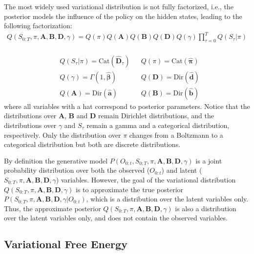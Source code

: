 \documentclass[twoside,11pt]{article}
\begin{document}
The most widely used variational distribution \citep{AI_TUTO,FRISTON2016862} is not fully factorized, i.e., the posterior models the influence of the policy on the hidden states, leading to the following factorization: 
\vspace{-0.2cm}
\begin{align}\label{vd}
Q(S_{0:T}, \pi, \bm{A}, \bm{B}, \bm{D}, \gamma) = Q(\pi)Q(\bm{A})Q(\bm{B})Q(\bm{D})Q(\gamma) \prod_{\tau=0}^{T} Q(S_\tau|\pi)
\end{align}
\vspace{-2cm}\\
\begin{align*}
&Q(S_\tau|\pi) = \text{Cat}(\bm{\hat{D}}_\tau) && Q(\pi) = \text{Cat}(\bm{\hat{\pi}})\\
&Q(\gamma) = \Gamma(1,\bm{\hat{\beta}}) && Q(\bm{D}) = \text{Dir}(\bm{\hat{d}})\\
&Q(\bm{A}) = \text{Dir}(\bm{\hat{a}}) && Q(\bm{B}) = \text{Dir}(\bm{\hat{b}})
\end{align*}
where all variables with a hat correspond to posterior parameters. Notice that the distributions over $\bm{A}$, $\bm{B}$ and $\bm{D}$ remain Dirichlet distributions, and the distributions over $\gamma$ and $S_\tau$ remain a gamma and a categorical distribution, respectively. Only the distribution over $\pi$ changes from a Boltzmann to a categorical distribution but both are discrete distributions.

\begin{remark}
By definition the generative model $P(O_{0:t}, S_{0:T}, \pi, \bm{A}, \bm{B}, \bm{D}, \gamma)$ is a joint probability distribution over both the observed ($O_{0:t}$) and latent ($S_{0:T}, \pi, \bm{A}, \bm{B}, \bm{D}, \gamma$) variables. However, the goal of the variational distribution
$Q(S_{0:T}, \pi, \bm{A}, \bm{B}, \bm{D}, \gamma)$ is to approximate the true posterior $P(S_{0:T}, \pi, \bm{A}, \bm{B}, \bm{D}, \gamma | O_{0:t})$, which is a distribution over the latent variables only. Thus, the approximate posterior $Q(S_{0:T}, \pi, \bm{A}, \bm{B}, \bm{D}, \gamma)$ is also a distribution over the latent variables only, and does not contain the observed variables.
\end{remark}

\subsection{Variational Free Energy}
\end{document}
